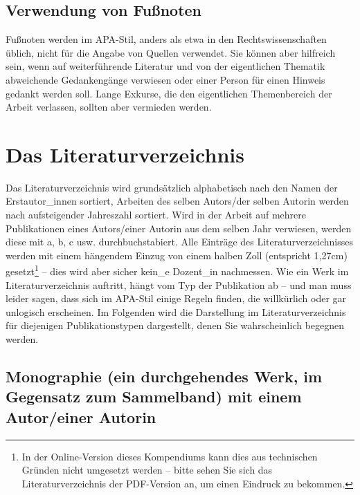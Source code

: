 \documentclass[ngerman,bibliography=totoc,oneside,12pt,a4paper]{scrbook}
\begin{document}
\subsection*{Verwendung von Fußnoten}\label{verwendung-von-fuuxdfnoten}

Fußnoten werden im APA-Stil, anders als etwa in den Rechtswissenschaften
üblich, nicht für die Angabe von Quellen verwendet. Sie können aber
hilfreich sein, wenn auf weiterführende Literatur und von der
eigentlichen Thematik abweichende Gedankengänge verwiesen oder einer
Person für einen Hinweis gedankt werden soll. Lange Exkurse, die den
eigentlichen Themenbereich der Arbeit verlassen, sollten aber vermieden
werden.

\section{Das Literaturverzeichnis}\label{das-literaturverzeichnis}

Das Literaturverzeichnis wird grundsätzlich alphabetisch nach den Namen
der Erstautor\_innen sortiert, Arbeiten des selben Autors/der selben
Autorin werden nach aufsteigender Jahreszahl sortiert. Wird in der
Arbeit auf mehrere Publikationen eines Autors/einer Autorin aus dem
selben Jahr verwiesen, werden diese mit a, b, c usw. durchbuchstabiert.
Alle Einträge des Literaturverzeichnisses werden mit einem hängendem
Einzug von einem halben Zoll (entspricht 1{,}27cm) gesetzt\footnote{In
  der Online-Version dieses Kompendiums kann dies aus technischen
  Gründen nicht umgesetzt werden -- bitte sehen Sie sich das
  Literaturverzeichnis der PDF-Version an, um einen Eindruck zu
  bekommen.} -- dies wird aber sicher kein\_e Dozent\_in nachmessen. Wie
ein Werk im Literaturverzeichnis auftritt, hängt vom Typ der Publikation
ab -- und man muss leider sagen, dass sich im APA-Stil einige Regeln
finden, die willkürlich oder gar unlogisch erscheinen. Im Folgenden wird
die Darstellung im Literaturverzeichnis für diejenigen Publikationstypen
dargestellt, denen Sie wahrscheinlich begegnen werden.

\subsection*{Monographie (ein durchgehendes Werk, im Gegensatz zum
Sammelband) mit einem Autor/einer
Autorin}\label{monographie-ein-durchgehendes-werk-im-gegensatz-zum-sammelband-mit-einem-autoreiner-autorin}
\end{document}
